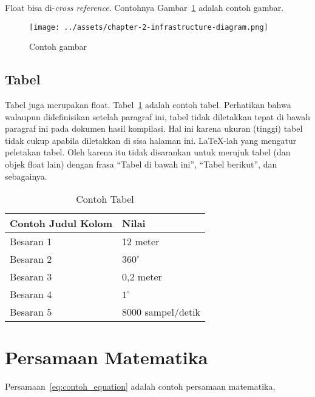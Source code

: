 \documentclass[../index.tex]{subfiles}
\begin{document}
Float bisa di-\textit{cross reference}. Contohnya Gambar~\ref{fig:contoh_gambar} adalah contoh gambar.

\begin{figure}[h]
	\centering
	\texttt{[image: ../assets/chapter-2-infrastructure-diagram.png]}
	\caption{Contoh gambar}
	\label{fig:contoh_gambar}
\end{figure}

\subsection{Tabel}

Tabel juga merupakan float. Tabel~\ref{table:contoh_tabel} adalah contoh tabel. Perhatikan bahwa walaupun didefinisikan setelah paragraf ini, tabel tidak diletakkan tepat di bawah paragraf ini pada dokumen hasil kompilasi. Hal ini karena ukuran (tinggi) tabel tidak cukup apabila diletakkan di sisa halaman ini. \LaTeX-lah yang mengatur peletakan tabel. Oleh karena itu tidak disarankan untuk merujuk tabel (dan objek float lain) dengan frasa ``Tabel di bawah ini'', ``Tabel berikut'', dan sebagainya.

\begin{table}[htbp]
	\centering
	\caption{Contoh Tabel}
	\label{table:contoh_tabel}
	\begin{tabular}{ll}
		\toprule
		\multicolumn{1}{l}{\textbf{Contoh Judul Kolom}} & \multicolumn{1}{l}{\textbf{Nilai}} \\
		\midrule
		Besaran 1                                       & 12 meter                           \\
		Besaran 2                                       & $360^\circ$                        \\
		Besaran 3                                       & 0,2 meter                          \\
		Besaran 4                                       & $1^\circ$                          \\
		Besaran 5                                       & 8000 sampel/detik                  \\
		\bottomrule
	\end{tabular}
\end{table}

\section{Persamaan Matematika}

Persamaan~\eqref{eq:contoh_equation} adalah contoh persamaan matematika,
\end{document}
